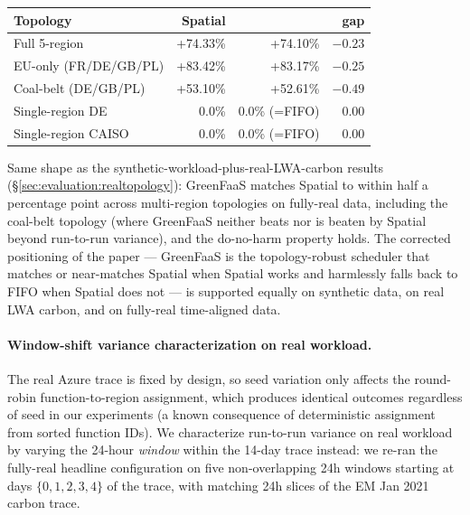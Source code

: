\begin{center}
\small
\begin{tabular}{lrrr}
\toprule
Topology               & Spatial   & \GreenFaaS{}     & gap \\
\midrule
Full 5-region          & +74.33\%  & +74.10\%   & $-0.23$ \\
EU-only (FR/DE/GB/PL)  & +83.42\%  & +83.17\%   & $-0.25$ \\
Coal-belt (DE/GB/PL)   & +53.10\%  & +52.61\%   & $-0.49$ \\
Single-region DE       &   0.0\%   & 0.0\% (=FIFO) & 0.00 \\
Single-region CAISO    &   0.0\%   & 0.0\% (=FIFO) & 0.00 \\
\bottomrule
\end{tabular}
\end{center}

Same shape as the synthetic-workload-plus-real-LWA-carbon results
(\S\ref{sec:evaluation:realtopology}): GreenFaaS matches Spatial to
within half a percentage point across multi-region topologies on
fully-real data, including the coal-belt topology (where GreenFaaS
neither beats nor is beaten by Spatial beyond run-to-run variance),
and the do-no-harm property holds. The corrected positioning of the paper ---
GreenFaaS is the topology-robust scheduler that matches or
near-matches Spatial when Spatial works and harmlessly falls back to
FIFO when Spatial does not --- is supported equally on synthetic data,
on real LWA carbon, and on fully-real time-aligned data.

\paragraph{Window-shift variance characterization on real workload.}
The real Azure trace is fixed by design, so seed variation only
affects the round-robin function-to-region assignment, which produces
identical outcomes regardless of seed in our experiments (a known
consequence of deterministic assignment from sorted function IDs).
We characterize run-to-run variance on real workload by varying the
24-hour \emph{window} within the 14-day trace instead: we re-ran the
fully-real headline configuration on five non-overlapping 24h windows
starting at days $\{0, 1, 2, 3, 4\}$ of the trace, with matching 24h
slices of the EM Jan 2021 carbon trace.

